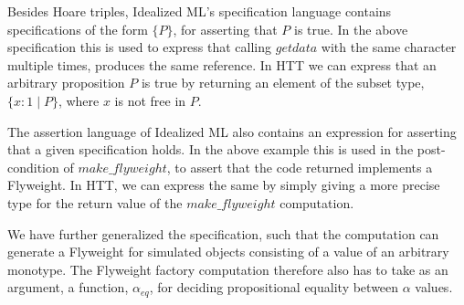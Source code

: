 \documentclass[a4paper,english]{article}
\begin{document}
Besides Hoare triples, Idealized ML's specification language contains
specifications of the form $\{ P \}$, for asserting that $P$ is true. In the
above specification this is used to express that calling $getdata$ with the
same character multiple times, produces the same reference. In HTT we can
express that an arbitrary proposition $P$ is true by returning an element of
the subset type, $\{ x : 1 \mid P \}$, where $x$ is not free in $P$. 

The assertion language of Idealized ML also contains an expression for
asserting that a given specification holds. In the above example this is used
in the post-condition of $make\_flyweight$, to assert that the code returned
implements a Flyweight. In HTT, we can express the same by simply giving a more
precise type for the return value of the $make\_flyweight$ computation. 

We have further generalized the specification, such that the computation can
generate a Flyweight for simulated objects consisting of a value of an
arbitrary monotype. The Flyweight factory computation therefore also has to
take as an argument, a function, $\alpha_{eq}$, for deciding propositional
equality between $\alpha$ values. 
\end{document}
